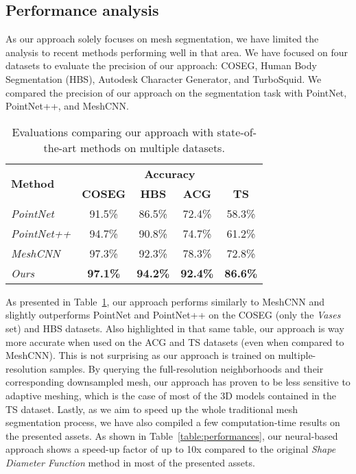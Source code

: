 \subsection{Performance analysis}
As our approach solely focuses on mesh segmentation, we have limited the analysis to recent methods performing well in that area. We have focused on four datasets to evaluate the precision of our approach: COSEG, Human Body Segmentation (HBS), Autodesk Character Generator, and TurboSquid. We compared the precision of our approach on the segmentation task with PointNet, PointNet++, and MeshCNN.

\begin{table}[h]
    \centering
    \begin{tabular}{|l||c|c|c|c|}
        \hline
        \multirow{2}{*}{\textbf{Method}} & \multicolumn{4}{|c|}{\textbf{Accuracy}}\\\cline{2-5}
          & \textbf{COSEG} & \textbf{HBS} & \textbf{ACG} & \textbf{TS}\\[0.5ex]
        \hline\hline
        \textsl{PointNet} & 91.5\% & 86.5\% & 72.4\% & 58.3\%\\
        \hline
        \textsl{PointNet++} & 94.7\% & 90.8\% & 74.7\% & 61.2\%\\
        \hline
        \textsl{MeshCNN} & 97.3\% & 92.3\% & 78.3\% & 72.8\%\\
        \hline
        \textsl{Ours} & \textbf{97.1\%} & \textbf{94.2\%} & \textbf{92.4\%} & \textbf{86.6\%}\\
        \hline
    \end{tabular}
    \caption{Evaluations comparing our approach with state-of-the-art methods on multiple datasets.}
    \label{table:metrics_STAR}
\end{table}
As presented in Table~\ref{table:metrics_STAR}, our approach performs similarly to MeshCNN and slightly outperforms PointNet and PointNet++ on the COSEG (only the \textsl{Vases} set) and HBS datasets. Also highlighted in that same table, our approach is way more accurate when used on the ACG and TS datasets (even when compared to MeshCNN). This is not surprising as our approach is trained on multiple-resolution samples. By querying the full-resolution neighborhoods and their corresponding downsampled mesh, our approach has proven to be less sensitive to adaptive meshing, which is the case of most of the 3D models contained in the TS dataset.
Lastly, as we aim to speed up the whole traditional mesh segmentation process, we have also compiled a few computation-time results on the presented assets. As shown in Table~\ref{table:performances}, our neural-based approach shows a speed-up factor of up to 10x compared to the original \textit{Shape Diameter Function} method in most of the presented assets.
